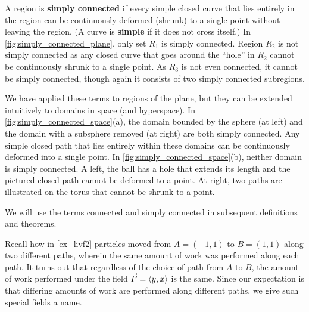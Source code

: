 A region is \textbf{simply connected} if every simple closed curve that lies entirely in the region can be continuously deformed (shrunk) to a single point without leaving the region.  (A curve is \textbf{simple} if it does not cross itself.) In \autoref{fig:simply_connected_plane}, only set $R_1$ is simply connected. Region $R_2$ is not simply connected as any closed curve that goes around the ``hole'' in $R_2$ cannot be continuously shrunk to a single point. As $R_3$ is not even connected, it cannot be simply connected, though again it consists of two simply connected subregions. 


We have applied these terms to regions of the plane, but they can be extended intuitively to domains in space (and hyperspace). In \autoref{fig:simply_connected_space}(a), the domain bounded by the sphere (at left) and the domain with a subsphere removed (at right) are both simply connected. Any simple closed path that lies entirely within these domains can be continuously deformed into a single point. In \autoref{fig:simply_connected_space}(b), neither domain is simply connected. A left, the ball has a hole that extends its length and the pictured closed path cannot be deformed to a point. At right, two paths are illustrated on the torus that cannot be shrunk to a point. 

We will use the terms connected and simply connected in subsequent definitions and theorems.

Recall how in \autoref{ex_livf2} particles moved from $A = (-1,1)$ to $B = (1,1)$ along two different paths, wherein the same amount of work was performed along each path. It turns out that regardless of the choice of path from $A$ to $B$, the amount of work performed under the field $\vec F =\left\langle y, x\right\rangle$ is the same. Since our expectation is that differing amounts of work are performed along different paths, we give such special fields a name. %

